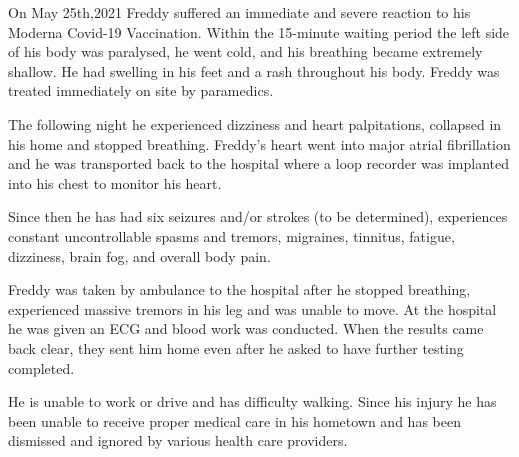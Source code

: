 On May 25th,2021 Freddy suffered an immediate and severe reaction to his Moderna
Covid-19 Vaccination. Within the 15-minute waiting period the left side of his
body was paralysed, he went cold, and his breathing became extremely shallow. He
had swelling in his feet and a rash throughout his body. Freddy was treated
immediately on site by paramedics.

The following night he experienced dizziness and heart palpitations, collapsed
in his home and stopped breathing. Freddy's heart went into major atrial
fibrillation and he was transported back to the hospital where a loop recorder
was implanted into his chest to monitor his heart.

Since then he has had six seizures and/or strokes (to be determined),
experiences constant uncontrollable spasms and tremors, migraines, tinnitus,
fatigue, dizziness, brain fog, and overall body pain.

Freddy was taken by ambulance to the hospital after he stopped breathing,
experienced massive tremors in his leg and was unable to move. At the hospital
he was given an ECG and blood work was conducted. When the results came back
clear, they sent him home even after he asked to have further testing completed.

He is unable to work or drive and has difficulty walking. Since his injury he
has been unable to receive proper medical care in his hometown and has been
dismissed and ignored by various health care providers.

